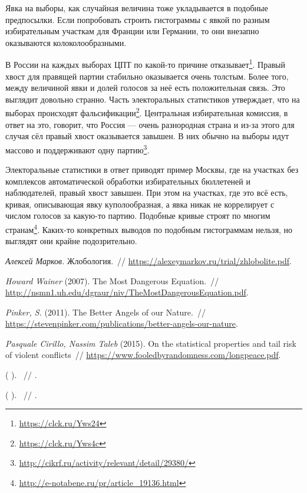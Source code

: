 \documentclass[12pt, a4paper, oneside]{article}
\begin{document}
Явка на выборы, как случайная величина тоже укладывается в подобные предпосылки. Если попробовать строить гистограммы с явкой по разным избирательным участкам для Франции или Германии, то они внезапно оказываются колоколообразными.

В России на каждых выборах ЦПТ по какой-то причине отказывает\footnote{\url{https://clck.ru/Yws24}}. Правый хвост для правящей партии стабильно оказывается очень толстым. Более того, между величиной явки и долей голосов за неё есть положительная связь. Это выглядит довольно странно. Часть электоральных статистиков утверждает, что на выборах происходят фальсификации\footnote{\url{https://clck.ru/Yws4c}}. Центральная избирательная комиссия, в ответ на это, говорит, что Россия --- очень разнородная страна и из-за этого для случая сёл правый хвост оказывается завышен. В них обычно на выборы идут массово и поддерживают одну партию\footnote{\url{http://cikrf.ru/activity/relevant/detail/29380/}}. 

Электоральные статистики в ответ приводят пример Москвы, где на участках без комплексов автоматической обработки избирательных бюллетеней и наблюдателей, правый хвост завышен. При этом на участках, где это всё есть, кривая, описывающая явку куполообразная, а явка никак не коррелирует с числом голосов за какую-то партию. Подобные кривые строят по многим странам\footnote{\url{http://e-notabene.ru/pr/article_19136.html}}. Каких-то конкретных выводов по подобным гистограммам нельзя, но выглядят они крайне подозрительно.


\begin{thebibliography}{1}
	
	
	
	\emph{Алексей Марков.}
	Жлобология.~//
	\url{https://alexeymarkov.ru/trial/zhlobolite.pdf}.
	
	\emph{Howard Wainer} (2007).
	The Most Dangerous Equation.~//
	\url{http://nsmn1.uh.edu/dgraur/niv/TheMostDangerousEquation.pdf}.

	\emph{Pinker, S.} (2011).
	The Better Angels of our Nature.~//
	\url{https://stevenpinker.com/publications/better-angels-our-nature}.	

	\emph{Pasquale Cirillo, Nassim Taleb} (2015).
	On the statistical properties and tail risk of violent
conflicts~//
	\url{https://www.fooledbyrandomness.com/longpeace.pdf}.

	\emph{ } ( ).
	 ~//
	\url{ }.

	\emph{ } ( ).
	 ~//
	\url{ }.



\end{thebibliography}
\end{document}
